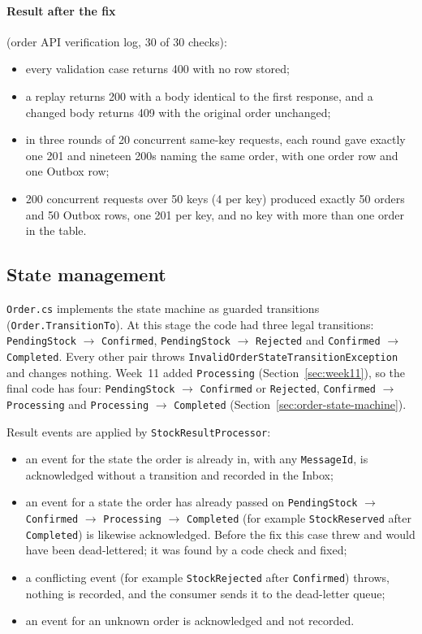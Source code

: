 \documentclass[a4paper]{report}
\begin{document}
\paragraph{Result after the fix} (order API verification log, 30 of 30 checks):
\begin{itemize}
  \item every validation case returns 400 with no row stored;
  \item a replay returns 200 with a body identical to the first response, and
    a changed body returns 409 with the original order unchanged;
  \item in three rounds of 20 concurrent same-key requests, each round gave
    exactly one 201 and nineteen 200s naming the same order, with one order
    row and one Outbox row;
  \item 200 concurrent requests over 50 keys (4 per key) produced exactly 50
    orders and 50 Outbox rows, one 201 per key, and no key with more than one
    order in the table.
\end{itemize}

\subsection{State management}

\texttt{Order.cs} implements the state machine as guarded
transitions (\texttt{Order.}\allowbreak\texttt{TransitionTo}). At this stage the code had three legal transitions: \texttt{PendingStock} $\to$ \texttt{Confirmed}, \texttt{PendingStock} $\to$ \texttt{Rejected} and \texttt{Confirmed} $\to$ \texttt{Completed}. Every other pair throws \texttt{InvalidOrderStateTransitionException} and changes nothing. Week~11 added \texttt{Processing} (Section~\ref{sec:week11}), so the final code has four: \texttt{PendingStock} $\to$ \texttt{Confirmed} or \texttt{Rejected}, \texttt{Confirmed} $\to$ \texttt{Processing} and \texttt{Processing} $\to$ \texttt{Completed} (Section~\ref{sec:order-state-machine}).

Result events are applied by \texttt{StockResultProcessor}:

\begin{itemize}
  \item an event for the state the order is already in, with any
    \texttt{MessageId}, is acknowledged without a transition and recorded in
    the Inbox;
  \item an event for a state the order has already passed on
    \texttt{PendingStock} $\to$ \texttt{Confirmed} $\to$ \texttt{Processing} $\to$ \texttt{Completed}
    (for example \texttt{StockReserved} after \texttt{Completed}) is likewise
    acknowledged. Before the fix this case threw and would have been
    dead-lettered; it was found by a code check and fixed;
  \item a conflicting event (for example \texttt{StockRejected} after
    \texttt{Confirmed}) throws, nothing is recorded, and the consumer sends it
    to the dead-letter queue;
  \item an event for an unknown order is acknowledged and not recorded.
\end{itemize}
\end{document}
